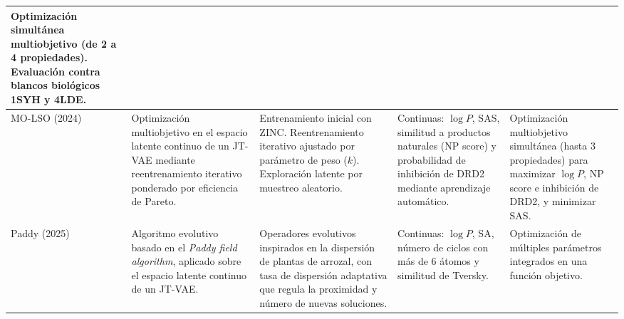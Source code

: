 \begin{landscape}
\begin{xltabular}{\linewidth}{@{} l >{\raggedright\arraybackslash}X >{\raggedright\arraybackslash}X >{\raggedright\arraybackslash}X >{\raggedright\arraybackslash}X @{}}
    Optimización simultánea multiobjetivo (de 2 a 4 propiedades). Evaluación contra blancos biológicos 1SYH y 4LDE. \\
    \midrule
    MO-LSO (2024) & 
    Optimización multiobjetivo en el espacio latente continuo de un JT-VAE mediante reentrenamiento iterativo ponderado por eficiencia de Pareto. & 
    Entrenamiento inicial con ZINC. Reentrenamiento iterativo ajustado por parámetro de peso ($k$). Exploración latente por muestreo aleatorio. & 
    Continuas: $\log P$, SAS, similitud a productos naturales (NP score) y probabilidad de inhibición de DRD2 mediante aprendizaje automático. & 
    Optimización multiobjetivo simultánea (hasta 3 propiedades) para maximizar $\log P$, NP score e inhibición de DRD2, y minimizar SAS. \\
    \midrule
    Paddy (2025) & 
    Algoritmo evolutivo basado en el \textit{Paddy field algorithm}, aplicado sobre el espacio latente continuo de un JT-VAE. & 
    Operadores evolutivos inspirados en la dispersión de plantas de arrozal, con tasa de dispersión adaptativa que regula la proximidad y número de nuevas soluciones. & 
    Continuas: $\log P$, SA, número de ciclos con más de 6 átomos y similitud de Tversky. & 
    Optimización de múltiples parámetros integrados en una función objetivo. \\
\end{xltabular}
\end{landscape}
